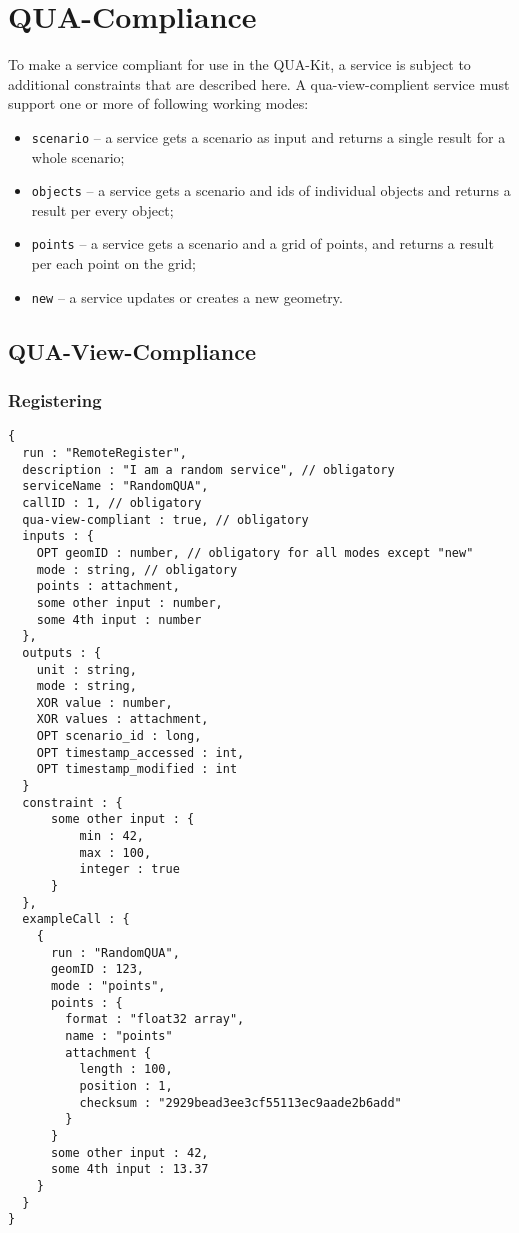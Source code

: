 \section{QUA-Compliance}
\label{ch:quacompliance}

To make a service compliant for use in the QUA-Kit, a service is subject to additional constraints that are described here.
A qua-view-complient service must support one or more of following working modes:
\begin{itemize}
\item 
    \texttt{scenario} -- a service gets a scenario as input and returns a single result for a whole scenario;
\item 
    \texttt{objects} -- a service gets a scenario and ids of individual objects and returns a result per every object;
\item 
    \texttt{points} -- a service gets a scenario and a grid of points, and returns a result per each point on the grid;
\item 
    \texttt{new} -- a service updates or creates a new geometry.
\end{itemize}

\subsection{QUA-View-Compliance}

\subsubsection{Registering}

\begin{lstlisting}[caption={Registering a QUA-compliant service}, label={lst:quacompliance}]
{
  run : "RemoteRegister",
  description : "I am a random service", // obligatory
  serviceName : "RandomQUA",
  callID : 1, // obligatory
  qua-view-compliant : true, // obligatory
  inputs : {
    OPT geomID : number, // obligatory for all modes except "new"
    mode : string, // obligatory
    points : attachment,
    some other input : number,
    some 4th input : number
  },
  outputs : {
    unit : string,
    mode : string,
    XOR value : number,
    XOR values : attachment,
    OPT scenario_id : long,
    OPT timestamp_accessed : int,
    OPT timestamp_modified : int
  }
  constraint : {
      some other input : {
          min : 42,
          max : 100,
          integer : true
      }
  },
  exampleCall : {
    {
      run : "RandomQUA",
      geomID : 123,
      mode : "points",
      points : {
        format : "float32 array",
        name : "points"
        attachment {
          length : 100,
          position : 1,
          checksum : "2929bead3ee3cf55113ec9aade2b6add"
        }
      }
      some other input : 42,
      some 4th input : 13.37
    }
  }
}
\end{lstlisting}

